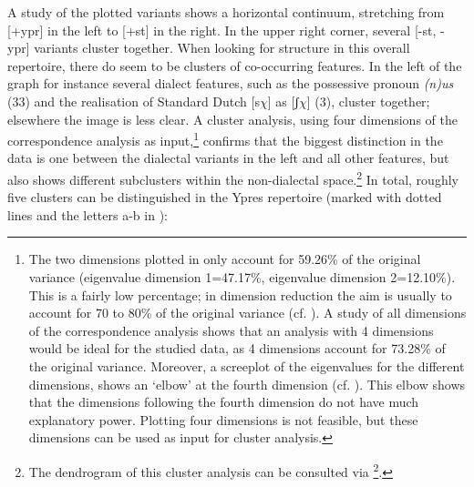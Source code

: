 \documentclass[output=paper]{LSP/langsci}
\begin{document}
A study of the plotted variants shows a horizontal continuum, stretching from [+ypr] in the left to [+st] in the right. In the upper right corner, several [-st, -ypr] variants cluster together. When looking for structure in this overall repertoire, there do seem to be clusters of co-occurring features. In the left of the graph for instance several dialect features, such as the possessive pronoun \textit{(n)us} (33) and the realisation of Standard Dutch [s$\chi $] as [ʃ$\chi $] (3), cluster together; elsewhere the image is less clear. A cluster analysis, using four dimensions of the correspondence analysis as input,\footnote{The two dimensions plotted in  only account for 59.26\% of the original variance (eigenvalue dimension 1=47.17\%, eigenvalue dimension 2=12.10\%). This is a fairly low percentage; in dimension reduction the aim is usually to account for 70 to 80\% of the original variance (cf. \citealt[83--84]{di_franco_factor_2014}). A study of all dimensions of the correspondence analysis shows that an analysis with 4 dimensions would be ideal for the studied data, as 4 dimensions account for 73.28\% of the original variance. Moreover, a screeplot of the eigenvalues for the different dimensions, shows an ‘elbow’ at the fourth dimension (cf. \citealt[83--84]{di_franco_factor_2014}). This elbow shows that the dimensions following the fourth dimension do not have much explanatory power. Plotting four dimensions is not feasible, but these dimensions can be used as input for cluster analysis.} confirms that the biggest distinction in the data is one between the dialectal variants in the left and all other features, but also shows different subclusters within the non-dialectal space.\footnote{The dendrogram of this cluster analysis can be consulted via \footnote{\url{https://zenodo.org/record/33588}}.} In total, roughly five clusters can be distinguished in the Ypres repertoire (marked with dotted lines and the letters a-b in ):
\end{document}
